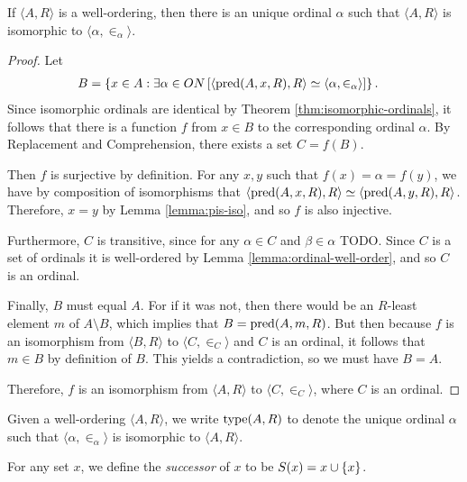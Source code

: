 \begin{thm}\label{thm:unique-isomorphic-ordinal}
    If $\langle A, R\rangle$ is a well-ordering, then there is an unique ordinal $\alpha$ such that $\langle A, R\rangle$ is isomorphic to $\langle \alpha, \in_{\alpha}\rangle$.
\end{thm}

\begin{proof}
    Let
    \begin{align*}
        B &= \left\{x \in A : \exists \alpha\in ON\left[\langle \operatorname{pred}(A, x, R), R\rangle \simeq \langle \alpha, \in_{\alpha}\rangle\right]\right\}.
    \end{align*}
    Since isomorphic ordinals are identical by Theorem \ref{thm:isomorphic-ordinals}, it follows that there is a function $f$ from $x \in B$ to the corresponding ordinal $\alpha$. By Replacement and Comprehension, there exists a set $C = f(B)$.

    Then $f$ is surjective by definition. For any $x, y$ such that $f(x) =\alpha = f(y)$, we have by composition of isomorphisms that $\langle \operatorname{pred}(A, x, R), R\rangle \simeq \langle \operatorname{pred}(A, y, R), R\rangle$. Therefore, $x = y$ by Lemma \ref{lemma:pis-iso}, and so $f$ is also injective.

    Furthermore, $C$ is transitive, since for any $\alpha \in C$ and $\beta \in \alpha$ {\color{red}TODO}. Since $C$ is a set of ordinals it is well-ordered by Lemma \ref{lemma:ordinal-well-order}, and so $C$ is an ordinal.

    Finally, $B$ must equal $A$. For if it was not, then there would be an $R$-least element $m$ of $A\setminus B$, which implies that $B = \operatorname{pred}(A, m, R)$. But then because $f$ is an isomorphism from $\langle B, R\rangle$ to $\langle C, \in_{C}\rangle$ and $C$ is an ordinal, it follows that $m \in B$ by definition of $B$. This yields a contradiction, so we must have $B = A$.

    Therefore, $f$ is an isomorphism from $\langle A, R\rangle$ to $\langle C, \in_{C}\rangle$, where $C$ is an ordinal.
\end{proof}

\begin{defn}
    Given a well-ordering $\langle A, R\rangle$, we write $\operatorname{type}(A, R)$ to denote the unique ordinal $\alpha$ such that $\langle \alpha, \in_{\alpha}\rangle$ is isomorphic to $\langle A, R\rangle$.
\end{defn}

\begin{defn}
    For any set $x$, we define the \emph{successor} of $x$ to be $S(x) = x \cup \{x\}$.
\end{defn}

